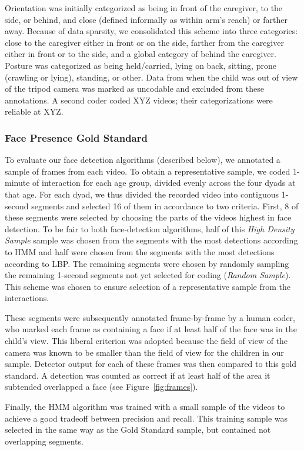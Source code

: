 \documentclass[10pt,letterpaper]{article}
\begin{document}
Orientation was initially categorized as being in front of the caregiver, to the side, or behind, and close (defined informally as within arm's reach) or farther away. Because of data sparsity, we consolidated this scheme into three categories: close to the caregiver either in front or on the side, farther from the caregiver either in front or to the side, and a global category of behind the caregiver. Posture was categorized as being held/carried, lying on back, sitting, prone (crawling or lying), standing, or other. Data from when the child was out of view of the tripod camera was marked as uncodable and excluded from these annotations. A second coder coded XYZ videos; their categorizations were reliable at XYZ. 

\subsubsection{Face Presence Gold Standard}

To evaluate our face detection algorithms (described below), we annotated a sample of frames from each video. To obtain a representative sample, we coded 1-minute of interaction for each age group, divided evenly across the four dyads at that age. For each dyad, we thus divided the recorded video into contiguous 1-second segments and selected 16 of them in accordance to two criteria. First, 8 of these segments were selected by choosing the parts of the videos highest in face detection. To be fair to both face-detection algorithms, half of this \emph{High Density Sample} sample was chosen from the segments with the most detections according to HMM and half were chosen from the segments with the most detections according to LBP. The remaining segments were chosen by randomly sampling the remaining 1-second segments not yet selected for coding (\emph{Random Sample}). This scheme was chosen to ensure selection of a representative sample from the interactions. 

These segments were subsequently annotated frame-by-frame by a human coder, who marked each frame as containing a face if at least half of the face was in the child's view. This liberal criterion was adopted because the field of view of the camera was known to be smaller than the field of view for the children in our sample. Detector output for each of these frames was then compared to this gold standard. A detection was counted as correct if at least half of the area it subtended overlapped a face (see Figure~\ref{fig:frames}).

Finally, the HMM algorithm was trained with a small sample of the videos to achieve a good tradeoff between precision and recall. This training sample was selected in the same way as the Gold Standard sample, but contained not overlapping segments.
\end{document}
